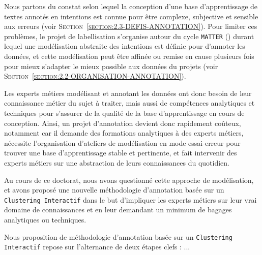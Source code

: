 		\begin{leftBarReminder}
			Nous partons du constat selon lequel la conception d'une base d'apprentissage de textes annotés en intentions est connue pour être complexe, subjective et sensible aux erreurs (voir \textsc{Section~\ref{section:2.3-DEFIS-ANNOTATION}}).
			Pour limiter ces problèmes, le projet de labellisation s'organise autour du cycle \texttt{MATTER} (\cite{pustejovsky-stubbs:2012:natural-language-annotation}) durant lequel une modélisation abstraite des intentions est définie pour d'annoter les données, et cette modélisation peut être affinée ou remise en cause plusieurs fois pour mieux s'adapter le mieux possible aux données du projets (voir \textsc{Section~\ref{section:2.2-ORGANISATION-ANNOTATION}}).
			
			Les experts métiers modélisant et annotant les données ont donc besoin de leur connaissance métier du sujet à traiter, mais aussi de compétences analytiques et techniques pour s'assurer de la qualité de la base d'apprentissage en cours de conception.
			Ainsi, un projet d'annotation devient donc rapidement coûteux, notamment car il demande des formations analytiques à des experts métiers, nécessite l'organisation d'ateliers de modélisation en mode essai-erreur pour trouver une base d'apprentissage stable et pertinente, et fait intervenir des experts métiers sur une abstraction de leurs connaissances du quotidien.
			
			Au cours de ce doctorat, nous avons questionné cette approche de modélisation, et avons proposé une nouvelle méthodologie d'annotation basée sur un \texttt{Clustering Interactif} dans le but d'impliquer les experts métiers sur leur vrai domaine de connaissances et en leur demandant un minimum de bagages analytiques ou techniques.
		\end{leftBarReminder}
		
		Nous proposition de méthodologie d'annotation basée sur un \texttt{Clustering Interactif} repose sur l'alternance de deux étapes clefs : ...
		
